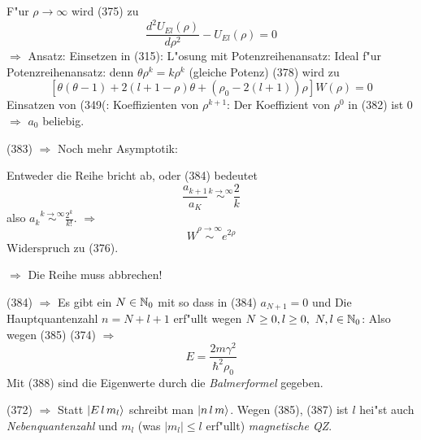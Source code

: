 \documentclass[a4paper]{scrartcl}
\begin{document}
{F"ur $\rho \rightarrow \infty$ wird (375) zu 
$$\frac{d^2 U_{E l}(\rho)}{d \rho^2} - U_{El}(\rho) = 0$$
$\Longrightarrow$
Ansatz: 
Einsetzen in (315):
L"osung mit Potenzreihenansatz:
Ideal f"ur Potenzreihenansatz:
denn $\theta \rho^k = k \rho^k$ (gleiche Potenz)
(378) wird zu
$$\left[ \theta (\theta-1) + 2(l +1 - \rho) \theta + (\rho_0 - 2(l+1)) \rho \right] W(\rho) = 0$$
Einsatzen von (349(:
Koeffizienten von $\rho^{k+1}$:
Der Koeffizient von $\rho^0$ in (382) ist $0$ $\Longrightarrow$ $a_0$  beliebig.

(383) $\Longrightarrow$
Noch mehr Asymptotik:

Entweder die Reihe bricht ab, oder (384) bedeutet
$$\frac{ a_{k+1}}{a_K} \stackrel{k \rightarrow \infty}\sim \frac 2k$$
also $a_k \stackrel{k \rightarrow \infty}\sim \frac{2^k}{k!}$. $\Longrightarrow$
$$W \stackrel{\rho \rightarrow \infty}\sim e^{2 \rho}$$
Widerspruch zu (376).

$\Longrightarrow$ Die Reihe muss abbrechen!

(384) $\Longrightarrow$ Es gibt ein $N \in \mathbb{N}_0$ mit
so dass in (384) $a_{N+1} = 0$ und 
Die Hauptquantenzahl $n = N+l+1$ erf"ullt wegen $N \geq 0, l \geq 0, \ N, l \in \mathbb{N}_0$:
Also wegen (385) 
(374) $\Longrightarrow$
$$E = \frac{2 m \gamma^2}{\hbar^2 \rho_0}$$
Mit (388) sind die Eigenwerte durch die \emph{Balmerformel}
gegeben.

(372) $\Longrightarrow$ 
Statt $\Ket{ E \, l \, m_l}$ schreibt man $\Ket{ n \, l \, m}$. Wegen (385), (387) ist
$l$ hei"st auch \emph{Nebenquantenzahl} und $m_l$ (was $\vert m_l \vert \leq l$ erf"ullt) \emph{magnetische QZ}.

}
\end{document}
